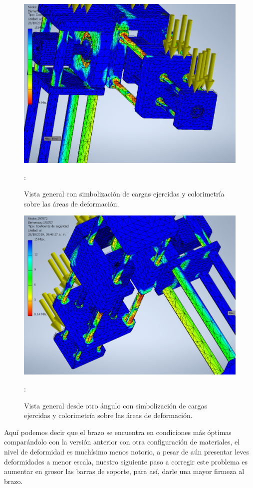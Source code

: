 \documentclass[11pt,a4paper,oldfontcommands,oneside]{memoir}
\begin{document}
\begin{flushleft}
\begin{figure}
\begin{center}
\includegraphics[scale=.55]{cb3.png} 
\end{center}
\caption{Vista general con simbolización de cargas ejercidas y colorimetría sobre las áreas de deformación.}
\label{tabla14}:
\end{figure}

\begin{figure}
\begin{center}
\includegraphics[scale=.55]{cb4.png} 
\end{center}
\caption{Vista general desde otro ángulo con simbolización de cargas ejercidas y colorimetría sobre las áreas de deformación.}
\label{tabla15}:
\end{figure}

Aquí podemos decir que el brazo se encuentra en condiciones más óptimas comparándolo con la versión anterior con otra configuración de materiales, el nivel de deformidad es muchísimo menos notorio, a pesar de aún presentar leves deformidades a menor escala, nuestro siguiente paso a corregir este problema es aumentar en grosor las barras de soporte, para así, darle una mayor firmeza al brazo.

\end{flushleft}
\end{document}
